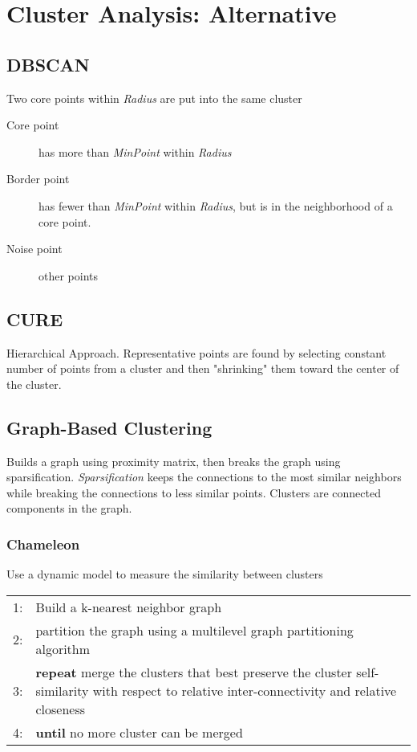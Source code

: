 \chapter{Cluster Analysis: Alternative}

\section{DBSCAN}
Two core points within \emph{Radius} are put into the same cluster
\begin{description}
\item[Core point] has more than \emph{MinPoint} within \emph{Radius}
\item[Border point] has fewer than \emph{MinPoint} within \emph{Radius}, but is in the neighborhood of a core point.
\item[Noise point] other points
\end{description}

\section{CURE}
Hierarchical Approach. Representative points are found by selecting constant number of points from a cluster and then "shrinking" them toward the center of the cluster. 

\section{Graph-Based Clustering}
Builds a graph using proximity matrix, then breaks the graph using sparsification. \emph{Sparsification} keeps the connections to the most similar neighbors while breaking the connections to less similar points. Clusters are connected components in the graph.

\subsection{Chameleon}
Use a dynamic model to measure the similarity between clusters

\begin{table}[h!]
\begin{tabular}{r p{12cm}}
\hline
    1: & Build a k-nearest neighbor graph\\
    2: & partition the graph using a multilevel graph partitioning algorithm\\
    3: & \textbf{repeat} merge the clusters that best preserve the cluster self-similarity with respect to relative inter-connectivity and relative closeness\\
    4: & \textbf{until} no more cluster can be merged \\
\hline
\end{tabular}
\end{table}

